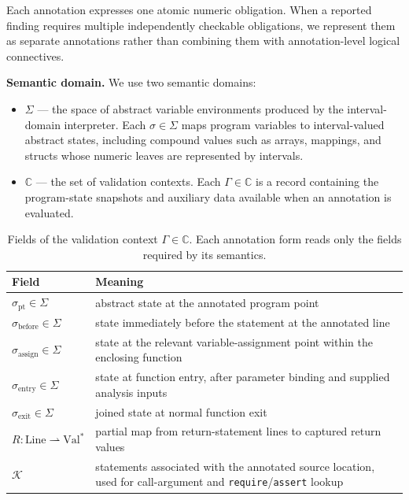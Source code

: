 \documentclass[pdflatex,sn-basic]{sn-jnl}%
\theoremstyle{thmstyleone}%
\theoremstyle{thmstyletwo}%
\theoremstyle{thmstylethree}%
\begin{document}
Each annotation expresses one atomic numeric obligation.
When a reported finding requires multiple independently checkable obligations,
we represent them as separate annotations rather than combining them with
annotation-level logical connectives.

\smallskip
\noindent\textbf{Semantic domain.}
We use two semantic domains:
\begin{itemize}
    \item $\Sigma$ --- the space of abstract variable environments produced by
    the interval-domain interpreter. Each $\sigma \in \Sigma$ maps program
    variables to interval-valued abstract states, including compound values
    such as arrays, mappings, and structs whose numeric leaves are represented
    by intervals.
    \item $\mathbb{C}$ --- the set of validation contexts. Each
    $\Gamma \in \mathbb{C}$ is a record containing the program-state snapshots
    and auxiliary data available when an annotation is evaluated.
\end{itemize}

\begin{table}[t]
\centering
\caption{Fields of the validation context $\Gamma \in \mathbb{C}$.
Each annotation form reads only the fields required by its semantics.}
\label{tab:validation-context}
\small
\begin{tabularx}{\linewidth}{@{} l L @{}}
\toprule
Field & Meaning \\
\midrule
$\sigma_{\text{pt}} \in \Sigma$
& abstract state at the annotated program point \\

$\sigma_{\text{before}} \in \Sigma$
& state immediately before the statement at the annotated line \\

$\sigma_{\text{assign}} \in \Sigma$
& state at the relevant variable-assignment point within the enclosing function \\

$\sigma_{\text{entry}} \in \Sigma$
& state at function entry, after parameter binding and supplied analysis inputs \\

$\sigma_{\text{exit}} \in \Sigma$
& joined state at normal function exit \\

$R : \text{Line} \rightharpoonup \text{Val}^*$
& partial map from return-statement lines to captured return values \\

$\mathcal{K}$
& statements associated with the annotated source location,
used for call-argument and \texttt{require}/\texttt{assert} lookup \\

\bottomrule
\end{tabularx}
\end{table}
\end{document}
